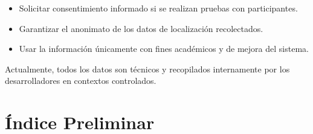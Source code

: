 \documentclass{article}
\begin{document}
\begin{itemize}
    \item Solicitar consentimiento informado si se realizan pruebas con participantes.
    \item Garantizar el anonimato de los datos de localización recolectados.
    \item Usar la información únicamente con fines académicos y de mejora del sistema.
\end{itemize}

Actualmente, todos los datos son técnicos y recopilados internamente por los desarrolladores en contextos controlados.
\newpage

\section{Índice Preliminar}
\end{document}
